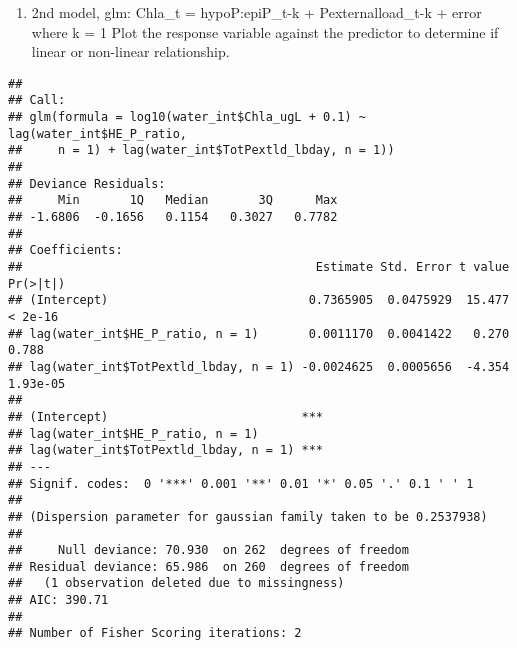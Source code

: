 \documentclass[
]{article}
\newenvironment{Shaded}{\begin{snugshade}}{\end{snugshade}}
\newcommand{\AttributeTok}[1]{\textcolor[rgb]{0.77,0.63,0.00}{#1}}
\newcommand{\CommentTok}[1]{\textcolor[rgb]{0.56,0.35,0.01}{\textit{#1}}}
\newcommand{\DecValTok}[1]{\textcolor[rgb]{0.00,0.00,0.81}{#1}}
\newcommand{\FloatTok}[1]{\textcolor[rgb]{0.00,0.00,0.81}{#1}}
\newcommand{\FunctionTok}[1]{\textcolor[rgb]{0.00,0.00,0.00}{#1}}
\newcommand{\NormalTok}[1]{#1}
\newcommand{\OtherTok}[1]{\textcolor[rgb]{0.56,0.35,0.01}{#1}}
\newcommand{\SpecialCharTok}[1]{\textcolor[rgb]{0.00,0.00,0.00}{#1}}
\providecommand{\tightlist}{%
  \setlength{\itemsep}{0pt}\setlength{\parskip}{0pt}}
\begin{document}
\begin{enumerate}
\def\labelenumi{\alph{enumi})}
\setcounter{enumi}{1}
\tightlist
\item
  2nd model, glm: Chla\_t = hypoP:epiP\_t-k + Pexternalload\_t-k + error
  where k = 1 Plot the response variable against the predictor to
  determine if linear or non-linear relationship.
\end{enumerate}

\begin{Shaded}
\end{Shaded}

\begin{verbatim}
## 
## Call:
## glm(formula = log10(water_int$Chla_ugL + 0.1) ~ lag(water_int$HE_P_ratio, 
##     n = 1) + lag(water_int$TotPextld_lbday, n = 1))
## 
## Deviance Residuals: 
##     Min       1Q   Median       3Q      Max  
## -1.6806  -0.1656   0.1154   0.3027   0.7782  
## 
## Coefficients:
##                                         Estimate Std. Error t value Pr(>|t|)
## (Intercept)                            0.7365905  0.0475929  15.477  < 2e-16
## lag(water_int$HE_P_ratio, n = 1)       0.0011170  0.0041422   0.270    0.788
## lag(water_int$TotPextld_lbday, n = 1) -0.0024625  0.0005656  -4.354 1.93e-05
##                                          
## (Intercept)                           ***
## lag(water_int$HE_P_ratio, n = 1)         
## lag(water_int$TotPextld_lbday, n = 1) ***
## ---
## Signif. codes:  0 '***' 0.001 '**' 0.01 '*' 0.05 '.' 0.1 ' ' 1
## 
## (Dispersion parameter for gaussian family taken to be 0.2537938)
## 
##     Null deviance: 70.930  on 262  degrees of freedom
## Residual deviance: 65.986  on 260  degrees of freedom
##   (1 observation deleted due to missingness)
## AIC: 390.71
## 
## Number of Fisher Scoring iterations: 2
\end{verbatim}
\end{document}
